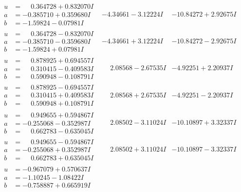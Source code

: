 \documentclass[1p]{elsarticle_modified}
\theoremstyle{definition}
\begin{document}
$$\begin{array}{c|c|c}
\begin{aligned}
u &= \phantom{-}0.364728 + 0.832070 I \\
a &= -0.385710 + 0.359680 I \\
b &= -1.59824 - 0.07981 I\end{aligned}
 & -4.34661 - 3.12224 I & -10.84272 + 2.92675 I \\ \hline\begin{aligned}
u &= \phantom{-}0.364728 - 0.832070 I \\
a &= -0.385710 - 0.359680 I \\
b &= -1.59824 + 0.07981 I\end{aligned}
 & -4.34661 + 3.12224 I & -10.84272 - 2.92675 I \\ \hline\begin{aligned}
u &= \phantom{-}0.878925 + 0.694557 I \\
a &= \phantom{-}0.310415 - 0.409583 I \\
b &= \phantom{-}0.590948 - 0.108791 I\end{aligned}
 & \phantom{-}2.08568 - 2.67535 I & -4.92251 + 2.20937 I \\ \hline\begin{aligned}
u &= \phantom{-}0.878925 - 0.694557 I \\
a &= \phantom{-}0.310415 + 0.409583 I \\
b &= \phantom{-}0.590948 + 0.108791 I\end{aligned}
 & \phantom{-}2.08568 + 2.67535 I & -4.92251 - 2.20937 I \\ \hline\begin{aligned}
u &= \phantom{-}0.949655 + 0.594867 I \\
a &= -0.255068 - 0.352987 I \\
b &= \phantom{-}0.662783 - 0.635045 I\end{aligned}
 & \phantom{-}2.08502 - 3.11024 I & -10.10897 + 3.32337 I \\ \hline\begin{aligned}
u &= \phantom{-}0.949655 - 0.594867 I \\
a &= -0.255068 + 0.352987 I \\
b &= \phantom{-}0.662783 + 0.635045 I\end{aligned}
 & \phantom{-}2.08502 + 3.11024 I & -10.10897 - 3.32337 I \\ \hline\begin{aligned}
u &= -0.967079 + 0.570637 I \\
a &= -1.10245 - 1.08422 I \\
b &= -0.758887 + 0.665919 I\end{aligned}

\end{array}$$
\end{document}
